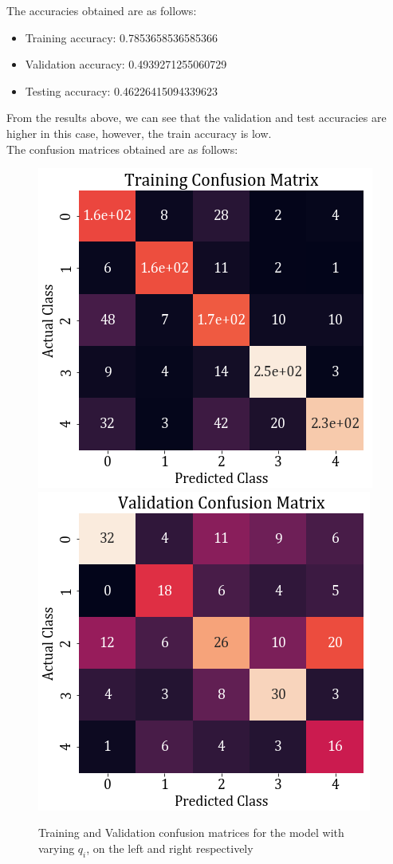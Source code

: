 \documentclass[11pt,a4paper]{article}
\newcommand{\noi}{\noindent}
\begin{document}
\noi
The accuracies obtained are as follows:
\begin{itemize}
    \itemsep0em
    \item Training accuracy: 0.7853658536585366
    \item Validation accuracy: 0.4939271255060729
    \item Testing accuracy: 0.46226415094339623
\end{itemize}

\noi
From the results above, we can see that the validation and test accuracies are higher in this case, however, the train accuracy is low.\\

\noi
The confusion matrices obtained are as follows:
\begin{figure}[H]
    \centering
    \includegraphics[scale=0.5]{images/2A/2a_full_cross_train.png}
    \includegraphics[scale=0.5]{images/2A/2a_full_cross_val.png}
    \caption{Training and Validation confusion matrices for the model with varying $q_i$, on the left and right respectively}
\end{figure}
\end{document}
